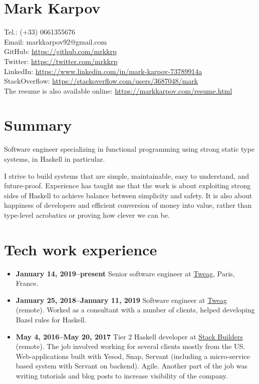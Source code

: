 \documentclass[a4paper,12pt]{article}
\begin{document}
\section*{Mark Karpov}

Tel.: (+33) 0661355676\\
Email: markkarpov92@gmail.com\\
GitHub: \href{https://github.com/mrkkrp}{https://github.com/mrkkrp}\\
Twitter: \href{https://twitter.com/mrkkrp}{https://twitter.com/mrkkrp}\\
LinkedIn: \href{https://www.linkedin.com/in/mark-karpov-73789914a}{https://www.linkedin.com/in/mark-karpov-73789914a}\\
StackOverflow: \href{https://stackoverflow.com/users/3687048/mark}{https://stackoverflow.com/users/3687048/mark}\\
The resume is also available online: \href{https://markkarpov.com/resume.html}{https://markkarpov.com/resume.html}

\sectionfont{\fontsize{12}{15}\selectfont\sectionrule{0pt}{0pt}{-5pt}{0.8pt}}

\section*{Summary}

Software engineer specializing in functional programming using strong static
type systems, in Haskell in particular.

I strive to build systems that are simple, maintainable, easy to understand,
and future-proof. Experience has taught me that the work is about exploiting
strong sides of Haskell to achieve balance between simplicity and safety. It
is also about happiness of developers and efficient conversion of money into
value, rather than type-level acrobatics or proving how clever we can be.

\section*{Tech work experience}

\begin{itemize}[noitemsep]
\item \textbf{January 14, 2019--present} Senior software engineer at
  \href{https://tweag.io}{Tweag}, Paris, France.
\item \textbf{January 25, 2018--January 11, 2019} Software engineer at
  \href{https://tweag.io}{Tweag} (remote). Worked as a consultant with a
  number of clients, helped developing Bazel rules for Haskell.
\item \textbf{May 4, 2016--May 20, 2017} Tier 2 Haskell developer at
  \href{https://www.stackbuilders.com/}{Stack Builders} (remote). The job
  involved working for several clients mostly from the US. Web-applications
  built with Yesod, Snap, Servant (including a micro-service based system
  with Servant on backend). Agile. Another part of the job was writing
  tutorials and blog posts to increase visibility of the company.
\end{itemize}
\end{document}
